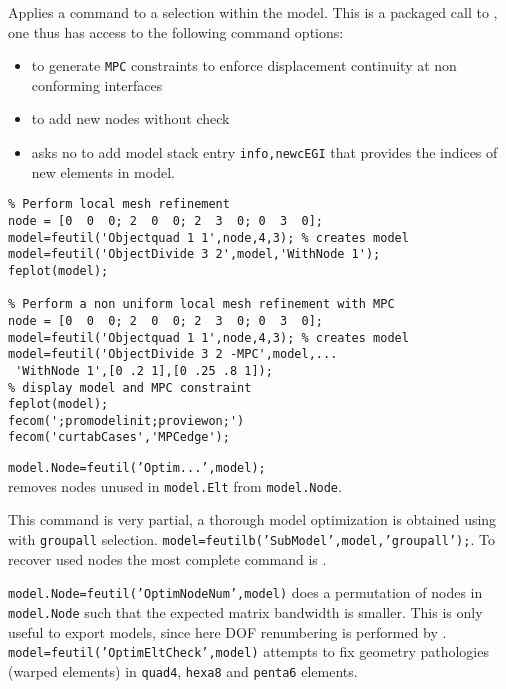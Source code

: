 
Applies a  command to a selection within the model. This is a packaged call to , one thus has access to the following command options:
\begin{itemize}
\item {} to generate {\tt MPC} constraints to enforce displacement continuity at non conforming interfaces
\item {} to add new nodes without check
\item {} asks no to add model stack entry {\tt info,newcEGI} that provides the indices of new elements in model.
\end{itemize}

\begin{verbatim}
% Perform local mesh refinement
node = [0  0  0; 2  0  0; 2  3  0; 0  3  0];
model=feutil('Objectquad 1 1',node,4,3); % creates model 
model=feutil('ObjectDivide 3 2',model,'WithNode 1');
feplot(model);

% Perform a non uniform local mesh refinement with MPC
node = [0  0  0; 2  0  0; 2  3  0; 0  3  0];
model=feutil('Objectquad 1 1',node,4,3); % creates model 
model=feutil('ObjectDivide 3 2 -MPC',model,...
 'WithNode 1',[0 .2 1],[0 .25 .8 1]);
% display model and MPC constraint
feplot(model);
fecom(';promodelinit;proviewon;')
fecom('curtabCases','MPCedge');
\end{verbatim}%


{\tt model.Node=feutil('Optim...',model);}\\
 removes nodes unused in {\tt model.Elt} from {\tt model.Node}.\\
\begin{SDT}
This command is very partial, a thorough model optimization is obtained using  with {\tt groupall} selection. {\tt model=feutilb('SubModel',model,'groupall');}. 
To recover used nodes the most complete command is .
\end{SDT}

{\tt model.Node=feutil('OptimNodeNum',model)} does a permutation of nodes in {\tt model.Node} such that the expected matrix bandwidth is smaller. This is only useful to export models, since here DOF renumbering is performed by \femk.\\
{\tt model=feutil('OptimEltCheck',model)} attempts to fix geometry pathologies (warped elements) in {\tt quad4}, {\tt hexa8} and {\tt penta6} elements.

